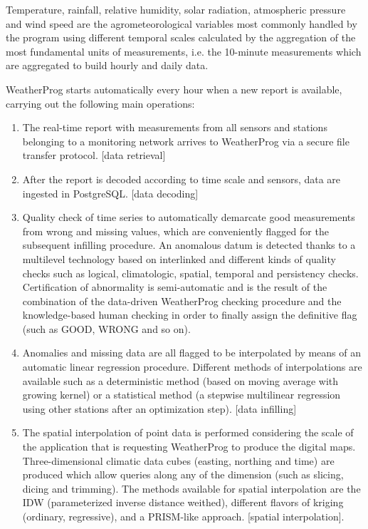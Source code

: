 \documentclass[authoryear,preprint,review,12pt]{elsarticle}
\begin{document}
Temperature, rainfall, relative humidity, solar radiation, atmospheric pressure and wind speed are the agrometeorological variables most commonly handled by the program using different temporal scales calculated by the aggregation of the most fundamental units of measurements, i.e. the 10-minute  measurements which are aggregated to build hourly and daily data.

WeatherProg starts automatically every hour when a new report is available, carrying out the following main operations:
\begin{enumerate}
    \item The real-time report with measurements from all sensors and stations belonging to a monitoring network arrives to WeatherProg via a secure file transfer protocol. [data retrieval]
    
    \item After the report is decoded according to time scale and sensors, data are ingested in PostgreSQL. [data decoding]

    \item Quality check of time series to automatically demarcate good measurements from wrong and missing values, which are conveniently flagged for the subsequent infilling procedure.
    An anomalous datum is detected thanks to a multilevel technology based on interlinked and different kinds of quality checks such as logical, climatologic, spatial, temporal and persistency checks. Certification of abnormality is semi-automatic and is the result of the combination of the data-driven WeatherProg checking procedure and the knowledge-based human checking in order to finally assign the definitive flag (such as GOOD, WRONG and so on).
    
    \item Anomalies and missing data are all flagged to be interpolated by means of an automatic linear regression procedure.
    Different methods of interpolations are available such as a deterministic method (based on moving average with growing kernel) or a statistical method (a stepwise multilinear regression using other stations after an optimization step). [data infilling]
    
    \item The spatial interpolation of point data is performed considering the scale of the application that is requesting WeatherProg to produce the digital maps.
    Three-dimensional climatic data cubes (easting, northing and time) are produced which allow queries along any of the dimension (such as slicing, dicing and trimming). The methods available for spatial interpolation are the IDW (parameterized inverse distance weithed), different flavors of kriging (ordinary, regressive), and a PRISM-like approach. [spatial interpolation].
\end{enumerate}
\end{document}
